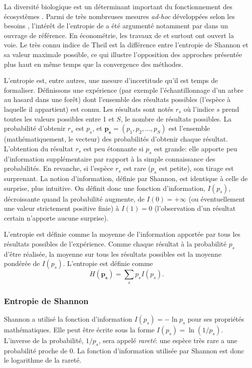 \documentclass[fleqn,10pt]{ArtEcoFoG} %
\begin{document}
La diversité biologique est un déterminant important du fonctionnement
des écosystèmes \citep{Chapin2000}. Parmi de très nombreuses mesures
\emph{ad-hoc} développées selon les besoins \citep{Peet1974}, l'intérêt
de l'entropie de \citet{Shannon1948} a été argumenté notamment par
\citet{Pielou1975} dans un ouvrage de référence. En économétrie, les
travaux de \citet{Davis1941} et surtout \citet{Theil1967} ont ouvert la
voie. Le très connu indice de Theil est la différence entre l'entropie
de Shannon et sa valeur maximale possible, ce qui illustre l'opposition
des approches présentée plus haut en même temps que la convergence des
méthodes.

L'entropie est, entre autres, une mesure d'incertitude qu'il est temps
de formaliser. Définissons une expérience (par exemple l'échantillonnage
d'un arbre au hasard dans une forêt) dont l'ensemble des résultats
possibles (l'espèce à laquelle il appartient) est connu. Les résultats
sont notés \(r_s\) où l'indice \(s\) prend toutes les valeurs possibles
entre 1 et \(S\), le nombre de résultats possibles. La probabilité
d'obtenir \(r_s\) est \(p_s\), et \(\mathbf{p_s}=(p_1,p_2,\dots,p_S)\)
est l'ensemble (mathématiquement, le vecteur) des probabilités d'obtenir
chaque résultat. L'obtention du résultat \(r_s\) est peu étonnante si
\(p_s\) est grande: elle apporte peu d'information supplémentaire par
rapport à la simple connaissance des probabilités. En revanche, si
l'espèce \(r_s\) est rare (\(p_s\) est petite), son tirage est
surprenant. La notion d'information, définie par Shannon, est identique
à celle de surprise, plus intuitive. On définit donc une fonction
d'information, \(I(p_s)\), décroissante quand la probabilité augmente,
de \(I(0)=+\infty\) (ou éventuellement une valeur strictement positive
finie) à \(I(1)=0\) (l'observation d'un résultat certain n'apporte
aucune surprise).

L'entropie est définie comme la moyenne de l'information apportée par
tous les résultats possibles de l'expérience. Comme chaque résultat à la
probabilité \(p_s\) d'être réalisée, la moyenne sur tous les résultats
possibles est la moyenne pondérée de \(I(p_s)\). L'entropie est définie
comme \[H(\mathbf{p_s})=\sum_{s}{p_s I(p_s)}.\]

\subsubsection{Entropie de Shannon}\label{entropie-de-shannon}

Shannon a utilisé la fonction d'information \(I(p_s)=-\ln{p_s}\) pour
ses propriétés mathématiques. Elle peut être écrite sous la forme
\(I(p_s)=\ln({1/p_s})\). L'inverse de la probabilité, \(1/p_s\), sera
appelé \emph{rareté}: une espèce très rare a une probabilité proche de
0. La fonction d'information utilisée par Shannon est donc le logarithme
de la rareté.
\end{document}
